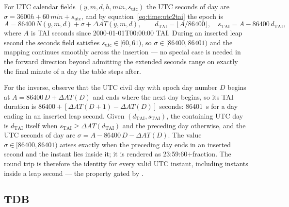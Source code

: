 For UTC calendar fields $(y, m, d, h, \mathit{min}, s_{\mathrm{utc}})$ the
UTC seconds of day are $\sigma = 3600h + 60\,\mathit{min} +
s_{\mathrm{utc}}$, and by equation~\eqref{eq:time:utc2tai} the epoch is
\begin{equation}
  A = 86400\,N(y,m,d) + \sigma + \Delta AT(y,m,d),
  \qquad
  d_{\mathrm{TAI}} = \lfloor A / 86400 \rfloor,\quad
  s_{\mathrm{TAI}} = A - 86400\,d_{\mathrm{TAI}},
  \label{eq:time:tai2utc}
\end{equation}
where $A$ is TAI seconds since 2000-01-01T00:00:00 TAI. During an inserted
leap second the seconds field satisfies $s_{\mathrm{utc}} \in [60, 61)$, so
$\sigma \in [86400, 86401)$ and the mapping continues smoothly across the
insertion --- no special case is needed in the forward direction beyond
admitting the extended seconds range on exactly the final minute of a day
the table steps after.

For the inverse, observe that the UTC civil day with epoch day number $D$
begins at $A = 86400\,D + \Delta AT(D)$ and ends where the next day begins,
so its TAI duration is $86400 + [\Delta AT(D{+}1) - \Delta AT(D)]$ seconds:
\qty{86401}{\second} for a day ending in an inserted leap second. Given
$(d_{\mathrm{TAI}}, s_{\mathrm{TAI}})$, the containing UTC day is
$d_{\mathrm{TAI}}$ itself when $s_{\mathrm{TAI}} \geq
\Delta AT(d_{\mathrm{TAI}})$ and the preceding day otherwise, and the UTC
seconds of day are $\sigma = A - 86400\,D - \Delta AT(D)$. The value
$\sigma \in [86400, 86401)$ arises exactly when the preceding day ends in
an inserted second and the instant lies inside it; it is rendered as
23:59:60$+$fraction. The round trip is therefore the identity for every
valid UTC instant, including instants inside a leap second --- the property
gated by .

\subsection{TDB}

